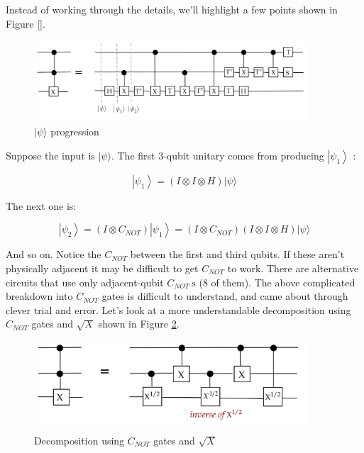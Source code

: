 \documentclass[main.tex]{subfiles}
\begin{document}
    Instead of working through the details, we'll highlight a few points shown in Figure \ref{}.
    
    \begin{figure}
        \centering
        \includegraphics[width=4in]{notes/figs/n08/33toffoli3.png}
        \caption{$|\psi\rangle$ progression}
        \label{fig:33toffoli3}
    \end{figure}
    
    Suppose the input is $|\psi\rangle$. The first 3-qubit unitary comes from producing $\left|\psi_{1}\right\rangle$ :
    
    $$
    \left|\psi_{1}\right\rangle=(I \otimes I \otimes H)|\psi\rangle
    $$
    
    The next one is:
    
    $$
    \left|\psi_{2}\right\rangle=\left(I \otimes C_{N O T}\right)\left|\psi_{1}\right\rangle=\left(I \otimes C_{N O T}\right)(I \otimes I \otimes H)|\psi\rangle
    $$
    
    And so on. Notice the $C_{NOT}$ between the first and third qubits. If these aren't physically adjacent it may be difficult to get $C_{NOT}$ to work. There are alternative circuits that use only adjacent-qubit $C_{N O T} \mathrm{~s}$ (8 of them). The above complicated breakdown into $C_{NOT}$ gates is difficult to understand, and came about through clever trial and error. Let's look at a more understandable decomposition using $C_{NOT}$ gates and $\sqrt{X}$ shown in Figure \ref{fig:34ccnot4}.
    
    \begin{figure}
        \centering
        \includegraphics[width=4in]{notes/figs/n08/34ccnot4.png}
        \caption{Decomposition using $C_{NOT}$ gates and $\sqrt{X}$}
        \label{fig:34ccnot4}
    \end{figure}
    
\end{document}
